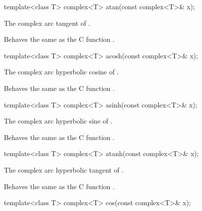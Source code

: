 %
%
\begin{itemdecl}
template<class T> complex<T> atan(const complex<T>& x);
\end{itemdecl}

\begin{itemdescr}
\pnum
\returns The complex arc tangent of .

\pnum
\remarks
Behaves the same as the C function .
\end{itemdescr}

%
%
\begin{itemdecl}
template<class T> complex<T> acosh(const complex<T>& x);
\end{itemdecl}

\begin{itemdescr}
\pnum
\returns The complex arc hyperbolic cosine of .

\pnum
\remarks
Behaves the same as the C function .
\end{itemdescr}

%
%
\begin{itemdecl}
template<class T> complex<T> asinh(const complex<T>& x);
\end{itemdecl}

\begin{itemdescr}
\pnum
\returns The complex arc hyperbolic sine of .

\pnum
\remarks
Behaves the same as the C function .
\end{itemdescr}

%
%
\begin{itemdecl}
template<class T> complex<T> atanh(const complex<T>& x);
\end{itemdecl}

\begin{itemdescr}
\pnum
\returns The complex arc hyperbolic tangent of .

\pnum
\remarks
Behaves the same as the C function .
\end{itemdescr}

%
\begin{itemdecl}
template<class T> complex<T> cos(const complex<T>& x);
\end{itemdecl}

